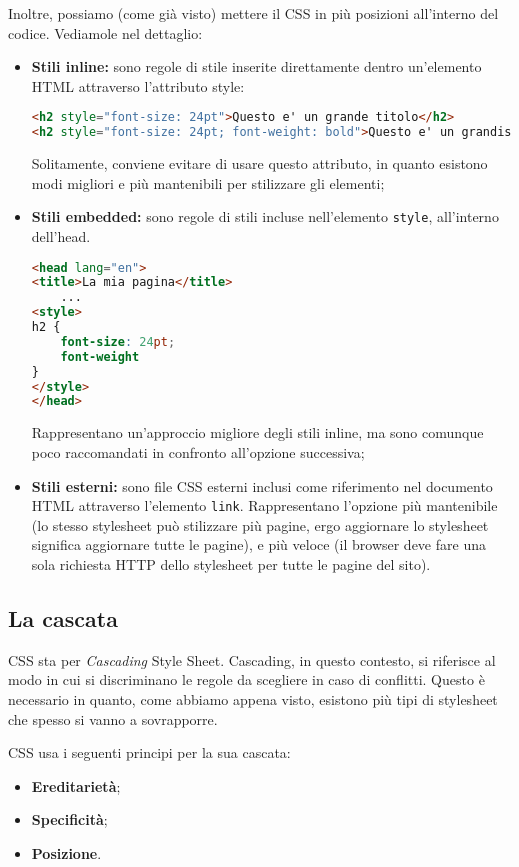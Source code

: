 \documentclass[a4paper,11pt]{article}
\begin{document}
Inoltre, possiamo (come già visto) mettere il CSS in più posizioni all'interno del codice.
Vediamole nel dettaglio:
\begin{itemize}
	\item \textbf{Stili inline:} sono regole di stile inserite direttamente dentro un'elemento HTML attraverso l'attributo style:
\begin{lstlisting}[language=html, style=codestyle]	
<h2 style="font-size: 24pt">Questo e' un grande titolo</h2>
<h2 style="font-size: 24pt; font-weight: bold">Questo e' un grandissimo titolo</h2>
\end{lstlisting}
Solitamente, conviene evitare di usare questo attributo, in quanto esistono modi migliori e più mantenibili per stilizzare gli elementi;

	\item \textbf{Stili embedded:} sono regole di stili incluse nell'elemento \lstinline|style|, all'interno dell'head.
\begin{lstlisting}[language=html, style=codestyle]	
<head lang="en">
<title>La mia pagina</title>
	...
<style>
h2 {
	font-size: 24pt; 
	font-weight
}
</style>
</head>
\end{lstlisting}
Rappresentano un'approccio migliore degli stili inline, ma sono comunque poco raccomandati in confronto all'opzione successiva;
	\item \textbf{Stili esterni:} sono file CSS esterni inclusi come riferimento nel documento HTML attraverso l'elemento \lstinline|link|. Rappresentano l'opzione più mantenibile (lo stesso stylesheet può stilizzare più pagine, ergo aggiornare lo stylesheet significa aggiornare tutte le pagine), e più veloce (il browser deve fare una sola richiesta HTTP dello stylesheet per tutte le pagine del sito).
\end{itemize}

\subsection{La cascata}
CSS sta per \textit{Cascading} Style Sheet. Cascading, in questo contesto, si riferisce al modo in cui si discriminano le regole da scegliere in caso di conflitti. Questo è necessario in quanto, come abbiamo appena visto, esistono più tipi di stylesheet che spesso si vanno a sovrapporre.

CSS usa i seguenti principi per la sua cascata:
\begin{itemize} 
		\item \textbf{Ereditarietà};
		\item \textbf{Specificità};
		\item \textbf{Posizione}.
\end{itemize}
\end{document}
